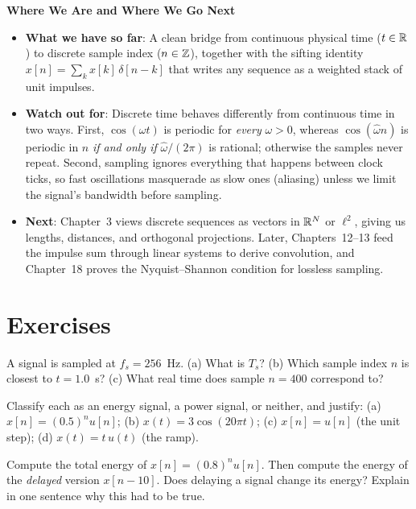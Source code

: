 \begin{connectionbox}
\textbf{Where We Are and Where We Go Next}
\begin{itemize}
  \item \textbf{What we have so far}: A clean bridge from continuous physical time ($t \in \mathbb{R}$) to
  discrete sample index ($n \in \mathbb{Z}$), together with the sifting identity
  $x[n] = \sum_k x[k]\,\delta[n-k]$ that writes any sequence as a weighted stack of unit impulses.
  \item \textbf{Watch out for}: Discrete time behaves differently from continuous time in two ways.
  First, $\cos(\omega t)$ is periodic for \emph{every} $\omega > 0$, whereas $\cos(\hat{\omega} n)$
  is periodic in $n$ \emph{if and only if} $\hat{\omega}/(2\pi)$ is rational; otherwise the samples
  never repeat. Second, sampling ignores everything that happens between clock ticks, so fast
  oscillations masquerade as slow ones (aliasing) unless we limit the signal's bandwidth before
  sampling.
  \item \textbf{Next}: Chapter~3 views discrete sequences as vectors in $\mathbb{R}^N$ or $\ell^2$, giving
  us lengths, distances, and orthogonal projections. Later, Chapters~12--13 feed the impulse sum
  through linear systems to derive convolution, and Chapter~18 proves the Nyquist--Shannon condition
  for lossless sampling.
\end{itemize}
\end{connectionbox}

\section{Exercises}
\label{ch02:exercises}

\begin{exercise}
A signal is sampled at $f_s = 256$~Hz. (a) What is $T_s$? (b) Which sample index $n$
is closest to $t = 1.0$~s? (c) What real time does sample $n = 400$ correspond to?
\end{exercise}

\begin{exercise}
Classify each as an energy signal, a power signal, or neither, and justify:
(a) $x[n] = (0.5)^n u[n]$; \;(b) $x(t) = 3\cos(20\pi t)$; \;(c) $x[n] = u[n]$ (the
unit step); \;(d) $x(t) = t\,u(t)$ (the ramp).
\end{exercise}

\begin{exercise}
Compute the total energy of $x[n] = (0.8)^n u[n]$. Then compute the energy of the
\emph{delayed} version $x[n-10]$. Does delaying a signal change its energy? Explain
in one sentence why this had to be true.
\end{exercise}

